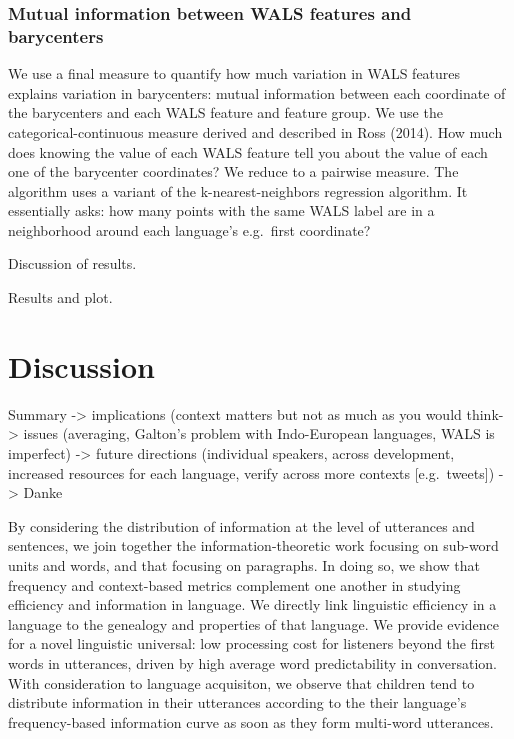 \documentclass[man,floatsintext]{apa6}
\begin{document}
\hypertarget{mutual-information-between-wals-features-and-barycenters}{%
\subsubsection{Mutual information between WALS features and barycenters}\label{mutual-information-between-wals-features-and-barycenters}}

We use a final measure to quantify how much variation in WALS features explains variation in barycenters: mutual information between each coordinate of the barycenters and each WALS feature and feature group. We use the categorical-continuous measure derived and described in Ross (2014). How much does knowing the value of each WALS feature tell you about the value of each one of the barycenter coordinates? We reduce to a pairwise measure. The algorithm uses a variant of the k-nearest-neighbors regression algorithm. It essentially asks: how many points with the same WALS label are in a neighborhood around each language's e.g.~first coordinate?

Discussion of results.

Results and plot.

\hypertarget{discussion}{%
\section{Discussion}\label{discussion}}

Summary -\textgreater{} implications (context matters but not as much as you would think-\textgreater{} issues (averaging, Galton's problem with Indo-European languages, WALS is imperfect) -\textgreater{} future directions (individual speakers, across development, increased resources for each language, verify across more contexts {[}e.g.~tweets{]}) -\textgreater{} Danke

By considering the distribution of information at the level of utterances and sentences, we join together the information-theoretic work focusing on sub-word units and words, and that focusing on paragraphs. In doing so, we show that frequency and context-based metrics complement one another in studying efficiency and information in language. We directly link linguistic efficiency in a language to the genealogy and properties of that language. We provide evidence for a novel linguistic universal: low processing cost for listeners beyond the first words in utterances, driven by high average word predictability in conversation. With consideration to language acquisiton, we observe that children tend to distribute information in their utterances according to the their language's frequency-based information curve as soon as they form multi-word utterances.
\end{document}
